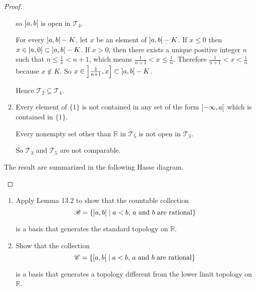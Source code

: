 \begin{proof}
\begin{enumerate}[label={(\roman*)}]
              so $\left]{a, b}\right[$ is open in $\mathscr{T}_{4}$.

              For every $\left]{a, b}\right[ - K$, let $x$ be an element of $\left]{a, b}\right[ - K$. If $x\leq 0$ then $x\in\left]{a, 0}\right]\subset \left]{a, b}\right[ - K$. If $x > 0$, then there exists a unique positive integer $n$ such that $n\leq \frac{1}{x} < n+1$, which means $\frac{1}{n+1} < x\leq \frac{1}{n}$. Therefore  $\frac{1}{n+1} < x < \frac{1}{n}$ because $x\notin K$. So $x\in\left]{\frac{1}{n+1}, x}\right]\subset \left]{a, b}\right[ - K$.

              Hence $\mathscr{T}_{2}\subsetneq \mathscr{T}_{4}$.
        \item Every element of $\{ 1 \}$ is not contained in any set of the form $\left]{-\infty, a}\right[$ which is contained in $\{ 1 \}$.

              Every nonempty set other than $\mathbb{R}$ in $\mathscr{T}_{5}$ is not open in $\mathscr{T}_{3}$.

              So $\mathscr{T}_{3}$ and $\mathscr{T}_{5}$ are not comparable.
    \end{enumerate}

    The result are summarized in the following Hasse diagram.
    \begin{center}
    \end{center}
\end{proof}

\begin{exercise}\label{chapter2:section13:exercise8}
    \begin{enumerate}[label={(\alph*)}]
        \item Apply Lemma 13.2 to show that the countable collection
        \[
            \mathscr{B} = \{ \left]{a, b}\right[ \mid \text{$a < b$, $a$ and $b$ are rational} \}
        \]

        is a basis that generates the standard topology on $\mathbb{R}$.
        \item Show that the collection
        \[
            \mathscr{C} = \{ \left[{a, b}\right[ \mid \text{$a < b$, $a$ and $b$ are rational} \}
        \]

        is a basis that generates a topology different from the lower limit topology on $\mathbb{R}$.
    \end{enumerate}
\end{exercise}

